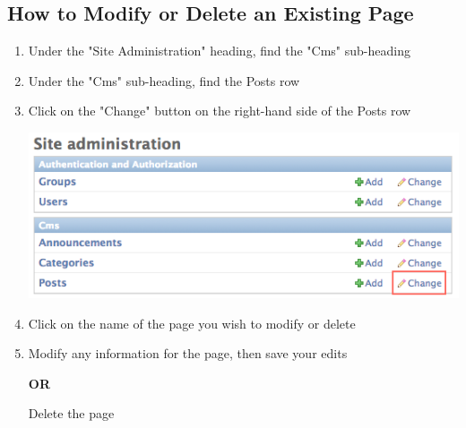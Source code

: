 \documentclass{article}
\begin{document}
\subsection*{How to Modify or Delete an Existing Page}
\begin{enumerate}
	\item Under the "Site Administration" heading, find the "Cms" sub-heading
	\item Under the "Cms" sub-heading, find the Posts row
	\item Click on the "Change" button on the right-hand side of the Posts row
	
	\includegraphics[scale=0.45]{posts-picture2.png}
	
	\item Click on the name of the page you wish to modify or delete
	\item Modify any information for the page, then save your edits
	
	\textbf{OR}
	
	Delete the page
	
\end{enumerate}

		
\end{document}
